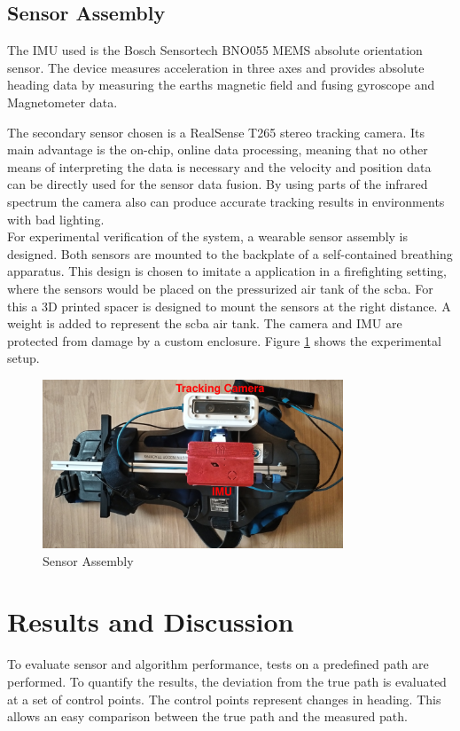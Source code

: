 \documentclass[engproc,conferenceproceedings,submit,pdftex,moreauthors]{Definitions/mdpi}
\begin{document}
\subsection{Sensor Assembly}
 
The IMU used  is the Bosch Sensortech BNO055 MEMS absolute orientation sensor. The device measures acceleration in three axes and provides absolute heading data by measuring the earths magnetic field and fusing gyroscope and Magnetometer data. 
  
The secondary sensor chosen is a RealSense T265 stereo tracking camera. Its main advantage is the on-chip, online data processing, meaning that no other means of interpreting the data is necessary and the velocity and position data can be directly used for the sensor data fusion. By using parts of the infrared spectrum the camera also can produce accurate tracking results in environments with bad lighting.\\
  
For experimental verification of the system, a wearable sensor assembly is designed. Both sensors are mounted to the backplate of a self-contained breathing apparatus. This design is chosen to imitate a application in a firefighting setting, where the sensors would be placed on the pressurized air tank of the scba. For this a 3D printed spacer is designed to mount the sensors at the right distance. A weight is added to represent the scba air tank. The camera and IMU are protected from damage by a custom enclosure.  Figure \ref{fig:Assembly} shows the experimental setup.\\

\begin{figure}
	\centering
	\includegraphics[width=0.8\textwidth]{Assembly.jpg}
	\caption{Sensor Assembly}
	\label{fig:Assembly}
\end{figure}


\section{Results and Discussion}
To evaluate sensor and algorithm performance, tests on a predefined path are performed. To quantify the results, the deviation from the true path is evaluated at a set of control points. The control points represent changes in heading. This allows an easy comparison between the true path and the measured path.
\end{document}
